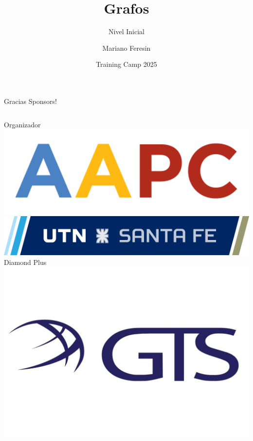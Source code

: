 \documentclass{beamer}
\title %
{Grafos}
\subtitle{Nivel Inicial}
\author[Mariano Feresin]{Mariano Feresin}
\institute[]{Universidad Tecnológica Nacional - Facultad Regional Santa Fe}
\date[TC 2025]{Training Camp 2025}
\begin{document}
\frame{\titlepage}





\begin{frame}{Gracias Sponsors!}
    \begin{columns}[t]
        \centering
        Organizador\\
        \vspace{0.5cm}
        \includegraphics[width=1\textwidth,keepaspectratio]{logos/aapc.png}
        \includegraphics[width=1\textwidth,keepaspectratio]{logos/utn_santafe.png}
        \centering
        Diamond Plus\\
        \includegraphics[width=1\textwidth,keepaspectratio]{logos/GTSlogo.jpeg}
    \end{columns}
\end{frame}
\end{document}
